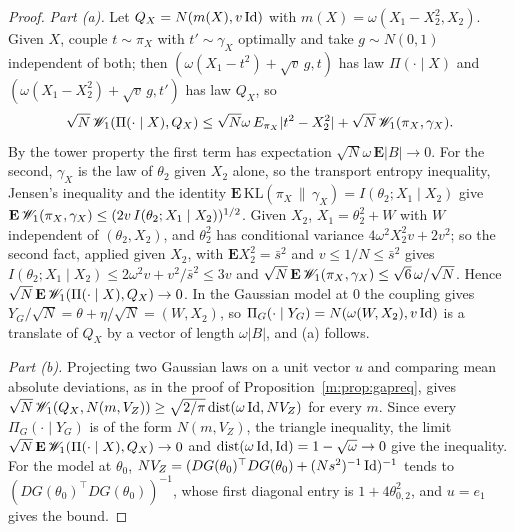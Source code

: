 \begin{proof}
\emph{Part (a).} Let $Q_X=N(m(X),v\operatorname{Id})$ with $m(X)=\omega(X_1-X_2^2,X_2)$. Given $X$, couple $t\sim\pi_X$ with $t'\sim\gamma_X$ optimally and take $g\sim N(0,1)$ independent of both; then $(\omega(X_1-t^2)+\sqrt v\,g,t)$ has law $\Pi(\cdot\mid X)$ and $(\omega(X_1-X_2^2)+\sqrt v\,g,t')$ has law $Q_X$, so
\[
\sqrt N\,\mathscr{W}_1(\Pi(\cdot\mid X),Q_X)\le\sqrt N\omega\,E_{\pi_X}|t^2-X_2^2|+\sqrt N\,\mathscr{W}_1(\pi_X,\gamma_X).
\]
By the tower property the first term has expectation $\sqrt N\omega\,\mathbf E|B|\to0$. For the second, $\gamma_X$ is the law of $\theta_2$ given $X_2$ alone, so the transport entropy inequality, Jensen's inequality and the identity $\mathbf E\,\mathrm{KL}(\pi_X\,\|\,\gamma_X)=I(\theta_2;X_1\mid X_2)$ give $\mathbf E\,\mathscr{W}_1(\pi_X,\gamma_X)\le(2v\,I(\theta_2;X_1\mid X_2))^{1/2}$. Given $X_2$, $X_1=\theta_2^2+W$ with $W$ independent of $(\theta_2,X_2)$, and $\theta_2^2$ has conditional variance $4\omega^2X_2^2v+2v^2$; so the second fact, applied given $X_2$, with $\mathbf EX_2^2=\bar s^2$ and $v\le1/N\le\bar s^2$ gives $I(\theta_2;X_1\mid X_2)\le2\omega^2v+v^2/\bar s^2\le3v$ and $\sqrt N\,\mathbf E\,\mathscr{W}_1(\pi_X,\gamma_X)\le\sqrt6\,\omega/\sqrt N$. Hence $\sqrt N\,\mathbf E\,\mathscr{W}_1(\Pi(\cdot\mid X),Q_X)\to0$. In the Gaussian model at $0$ the coupling gives $Y_G/\sqrt N=\theta+\eta/\sqrt N=(W,X_2)$, so $\Pi_G(\cdot\mid Y_G)=N(\omega(W,X_2),v\operatorname{Id})$ is a translate of $Q_X$ by a vector of length $\omega|B|$, and (a) follows.

\emph{Part (b).} Projecting two Gaussian laws on a unit vector $u$ and comparing mean absolute deviations, as in the proof of Proposition~\ref{m:prop:gapreq}, gives $\sqrt N\,\mathscr{W}_1(Q_X,N(m,V_Z))\ge\sqrt{2/\pi}\,\mathrm{dist}(\omega\operatorname{Id},NV_Z)$ for every $m$. Since every $\Pi_G(\cdot\mid Y_G)$ is of the form $N(m,V_Z)$, the triangle inequality, the limit $\sqrt N\,\mathbf E\,\mathscr{W}_1(\Pi(\cdot\mid X),Q_X)\to0$ and $\mathrm{dist}(\omega\operatorname{Id},\operatorname{Id})=1-\sqrt\omega\to0$ give the inequality. For the model at $\theta_0$, $NV_Z=(DG(\theta_0)^\top DG(\theta_0)+(Ns^2)^{-1}\operatorname{Id})^{-1}$ tends to $(DG(\theta_0)^\top DG(\theta_0))^{-1}$, whose first diagonal entry is $1+4\theta_{0,2}^2$, and $u=e_1$ gives the bound.


\end{proof}
